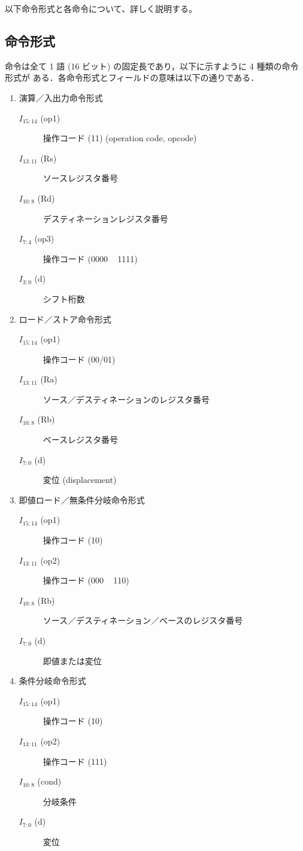 \documentclass[a4j,titlepage]{jarticle}
\begin{document}
以下命令形式と各命令について、詳しく説明する。

\subsection{命令形式}
命令は全て 1 語 (16 ビット) の固定長であり，以下に示すように 4 種類の命令形式が
ある．各命令形式とフィールドの意味は以下の通りである．
\begin{enumerate}
\item 演算／入出力命令形式
\begin{description}
    \item [$I_{15:14}$ (op1)] 操作コード (11) (operation code, opcode)
    \item [$I_{13:11}$ (Rs)] ソースレジスタ番号
    \item [$I_{10:8}$ (Rd)] デスティネーションレジスタ番号
    \item [$I_{7:4}$ (op3)] 操作コード (0000 ~ 1111)
    \item [$I_{3:0}$ (d)] シフト桁数    
\end{description}
\item ロード／ストア命令形式
\begin{description}
\item [$I_{15:14}$ (op1)] 操作コード (00/01)
\item [$I_{13:11}$ (Ra)] ソース／デスティネーションのレジスタ番号
\item [$I_{10:8}$ (Rb)] ベースレジスタ番号
\item [$I_{7:0}$ (d)] 変位 (displacement)
\end{description}
\item 即値ロード／無条件分岐命令形式
\begin{description}
\item [$I_{15:14}$ (op1)]操作コード (10)
\item [$I_{13:11}$ (op2)]操作コード (000 ~ 110)
\item [$I_{10:8}$ (Rb)]ソース／デスティネーション／ベースのレジスタ番号
\item [$I_{7:0}$ (d)]即値または変位
\end{description}
\item 条件分岐命令形式
\begin{description}
\item [$I_{15:14}$ (op1)]操作コード (10)
\item [$I_{13:11}$ (op2)]操作コード (111)
\item [$I_{10:8}$ (cond)]分岐条件
\item [$I_{7:0}$ (d)]変位
\end{description}
\end{enumerate}
\end{document}
